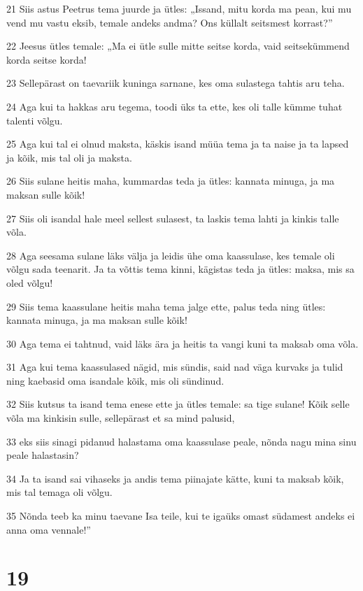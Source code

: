 \par 21 Siis astus Peetrus tema juurde ja ütles: „Issand, mitu korda ma pean, kui mu vend mu vastu eksib, temale andeks andma? Ons küllalt seitsmest korrast?”
\par 22 Jeesus ütles temale: „Ma ei ütle sulle mitte seitse korda, vaid seitsekümmend korda seitse korda!
\par 23 Sellepärast on taevariik kuninga sarnane, kes oma sulastega tahtis aru teha.
\par 24 Aga kui ta hakkas aru tegema, toodi üks ta ette, kes oli talle kümme tuhat talenti võlgu.
\par 25 Aga kui tal ei olnud maksta, käskis isand müüa tema ja ta naise ja ta lapsed ja kõik, mis tal oli ja maksta.
\par 26 Siis sulane heitis maha, kummardas teda ja ütles: kannata minuga, ja ma maksan sulle kõik!
\par 27 Siis oli isandal hale meel sellest sulasest, ta laskis tema lahti ja kinkis talle võla.
\par 28 Aga seesama sulane läks välja ja leidis ühe oma kaassulase, kes temale oli võlgu sada teenarit. Ja ta võttis tema kinni, kägistas teda ja ütles: maksa, mis sa oled võlgu!
\par 29 Siis tema kaassulane heitis maha tema jalge ette, palus teda ning ütles: kannata minuga, ja ma maksan sulle kõik!
\par 30 Aga tema ei tahtnud, vaid läks ära ja heitis ta vangi kuni ta maksab oma võla.
\par 31 Aga kui tema kaassulased nägid, mis sündis, said nad väga kurvaks ja tulid ning kaebasid oma isandale kõik, mis oli sündinud.
\par 32 Siis kutsus ta isand tema enese ette ja ütles temale: sa tige sulane! Kõik selle võla ma kinkisin sulle, sellepärast et sa mind palusid,
\par 33 eks siis sinagi pidanud halastama oma kaassulase peale, nõnda nagu mina sinu peale halastasin?
\par 34 Ja ta isand sai vihaseks ja andis tema piinajate kätte, kuni ta maksab kõik, mis tal temaga oli võlgu.
\par 35 Nõnda teeb ka minu taevane Isa teile, kui te igaüks omast südamest andeks ei anna oma vennale!”


\chapter{19}

